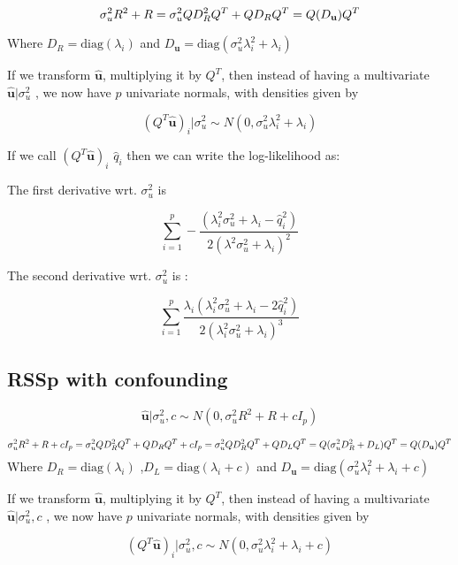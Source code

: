 $$\sigma^2_uR^2+R \\ = \sigma_u^2QD_R^2Q^{T} + Q D_{R} Q^{T} \\ =Q(D_\textbf{u})Q^{T}$$

Where \(D_R=\text{diag}\left(\lambda_i\right)\) and \(D_\textbf{u}=\text{diag}\left(\sigma_u^2\lambda_i^2+\lambda_i\right)\)

If we transform \(\hat{\textbf{u}}\), multiplying it by \(Q^{T}\), then instead of having a multivariate  \(\hat{\textbf{u}}|\sigma_u^2\) , we now have \(p\) univariate normals, with densities given by 

$$(Q^{T}\hat{\textbf{u}})_i|\sigma_u^2  \sim N(0,\sigma_u^2\lambda_i^2+\lambda_i)$$

If we call \((Q^{T}\hat{\textbf{u}})_i\) \(\hat{q}_i\) then we can write the log-likelihood as:



The first derivative wrt. \(\sigma_u^2\) is

$$\sum_{i=1}^p -\frac{(\lambda_i^2 \sigma_u^2 + \lambda_i - \hat{q}_i^2)}{2 (\lambda^2 \sigma_u^2 + \lambda_i)^2}$$

The second derivative wrt. \(\sigma_u^2\) is :

$$\sum_{i=1}^p  \frac{\lambda_i (\lambda_i^2 \sigma_u^2 + \lambda_i - 2 \hat{q}_i^2)}{2 (\lambda_i^2 \sigma_u^2 + \lambda_i)^3}$$

\subsection{RSSp with confounding}\label{sec:org33ff459}


$$ \hat{\textbf{u}}|\sigma_u^2,c \sim N(0,\sigma_u^2R^2+R+cI_p)$$

$$\sigma^2_uR^2+R+cI_p \\ = \sigma_u^2QD_R^2Q^{T} + Q D_{R} Q^{T} + cI_p \\ =\sigma_u^2QD_R^2Q^{T}+QD_LQ^{T} \\ =Q(\sigma_u^2D^2_R + D_L)Q^{T} \\ =Q(D_\textbf{u})Q^{T}$$
Where \(D_R=\text{diag}\left(\lambda_i\right)\) ,\(D_L=\text{diag}\left(\lambda_i+c\right)\) and \(D_\textbf{u}=\text{diag}\left(\sigma_u^2\lambda_i^2+\lambda_i+c\right)\)

If we transform \(\hat{\textbf{u}}\), multiplying it by \(Q^{T}\), then instead of having a multivariate  \(\hat{\textbf{u}}|\sigma_u^2,c\) , we now have \(p\) univariate normals, with densities given by 

$$(Q^{T}\hat{\textbf{u}})_i|\sigma_u^2,c  \sim N(0,\sigma_u^2\lambda_i^2+\lambda_i+c)$$

